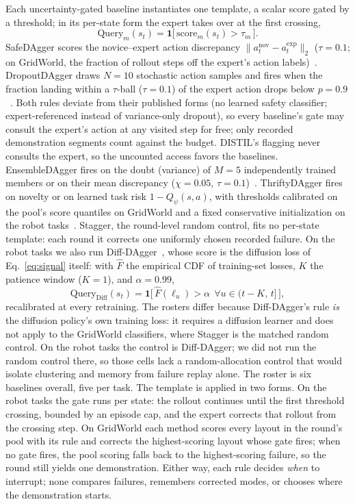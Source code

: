 \documentclass[letterpaper]{article} %
\begin{document}
Each uncertainty-gated baseline instantiates one template, a scalar score
gated by a threshold; in its per-state form the expert takes over at the
first crossing,
\begin{equation}
\mathrm{Query}_m(s_t)=\mathbf{1}\big[\,\mathrm{score}_m(s_t)>\tau_m\,\big].
\label{eq:query}
\end{equation}
SafeDAgger scores the novice--expert action discrepancy
$\|a^{\mathrm{nov}}_t-a^{\mathrm{exp}}_t\|_2$ ($\tau{=}0.1$;
on GridWorld, the fraction of rollout steps off the expert's action
labels)~\citep{zhang2017safedagger}. DropoutDAgger draws
$N{=}10$ stochastic action samples and fires when the fraction landing
within a $\tau$-ball ($\tau{=}0.1$) of the expert action drops below
$p{=}0.9$~\citep{menda2017dropoutdagger}. Both rules deviate
from their published forms (no learned safety classifier; expert-referenced
instead of variance-only dropout), so every baseline's gate may consult the
expert's action at any visited step for free; only recorded demonstration
segments count against the budget. DISTIL's flagging never consults the
expert, so the uncounted access favors the baselines.
EnsembleDAgger fires on the doubt (variance) of $M{=}5$ independently trained
members or on their mean discrepancy ($\chi{=}0.05$,
$\tau{=}0.1$)~\citep{menda2019ensembledagger}.
ThriftyDAgger fires on novelty or on learned task risk $1-Q_\psi(s,a)$, with
thresholds calibrated on the pool's score quantiles on GridWorld and a fixed
conservative initialization on the robot
tasks~\citep{hoque2021thriftydagger}. Stagger, the round-level random
control, fits no per-state template: each round it corrects one uniformly
chosen recorded failure. On the robot tasks we also run
Diff-DAgger~\citep{lee2025diffdagger}, whose score is the diffusion loss of
Eq.~\ref{eq:signal} itself: with $\hat F$ the empirical CDF of training-set
losses, $K$ the patience window ($K{=}1$), and $\alpha{=}0.99$,
\begin{equation}
\mathrm{Query}_{\mathrm{Diff}}(s_t)=
\mathbf{1}\big[\,\hat F(\ell_u)>\alpha\ \ \forall u\in(t{-}K,\,t]\,\big],
\label{eq:diffdagger}
\end{equation}
recalibrated at every retraining. The rosters differ because Diff-DAgger's
rule \emph{is} the diffusion policy's own training loss: it requires a
diffusion learner and does not apply to the GridWorld classifiers, where
Stagger is the matched random control. On the robot tasks the control is
Diff-DAgger; we did not run the random control there, so those cells lack
a random-allocation control that would isolate clustering and memory from
failure replay alone. The roster is six baselines overall, five per task.
The template is applied in two forms. On the robot tasks the gate runs per
state: the rollout continues until the first threshold crossing, bounded
by an episode cap, and the expert corrects that rollout from the crossing
step. On GridWorld each method scores every layout in the round's pool
with its rule and corrects the highest-scoring layout whose gate fires;
when no gate fires, the pool scoring falls back to the highest-scoring
failure, so the round still yields one demonstration. Either way, each
rule decides \emph{when} to interrupt; none compares failures,
remembers corrected modes, or chooses where the demonstration starts.
\end{document}

